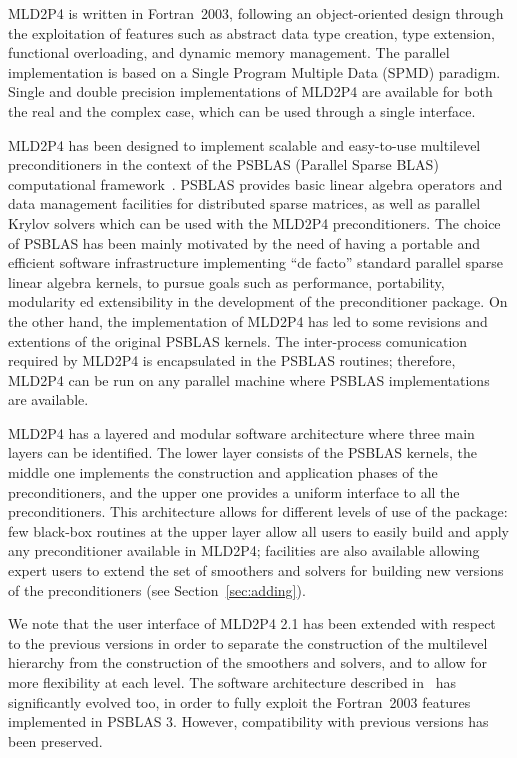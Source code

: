 MLD2P4 is written in Fortran~2003, following an
object-oriented design through the exploitation of features
such as abstract data type creation, type extension, functional overloading, and
dynamic memory management. %
The parallel implementation is based on a Single Program Multiple Data
(SPMD) paradigm.  Single and
double precision implementations of MLD2P4 are available for both the
real and the complex case, which can be used through a single
interface. 

MLD2P4 has been designed to implement scalable and easy-to-use
multilevel preconditioners in the context of the PSBLAS (Parallel Sparse BLAS)
computational framework~\cite{psblas_00,PSBLAS3}. PSBLAS provides basic linear algebra
operators and data management facilities for distributed sparse matrices,
as well as parallel Krylov solvers which can be used with the MLD2P4 preconditioners.
The choice of PSBLAS has been mainly motivated by the need of having
a portable and efficient software infrastructure implementing ``de facto'' standard
parallel sparse linear algebra kernels, to pursue goals such as performance,
portability, modularity ed extensibility in the development of the preconditioner
package. On the other hand, the implementation of MLD2P4 has led to some
revisions and extentions of the original PSBLAS kernels.
The inter-process comunication required by MLD2P4 is encapsulated
in the PSBLAS routines;
therefore, MLD2P4 can be run on any parallel machine where PSBLAS 
implementations are available.

MLD2P4 has a layered and modular software architecture where three main layers can be
identified.  The lower layer consists of the PSBLAS kernels, the middle one implements
the construction and application phases of the preconditioners, and the upper one
provides a uniform interface to all the preconditioners. 
This architecture allows for different levels of use of the package:
few black-box routines at the upper layer allow all users to easily
build and apply any preconditioner available in MLD2P4;
facilities are also available allowing  expert users to extend the set of smoothers
and solvers for building new versions of the preconditioners (see
Section~\ref{sec:adding}). 

We note that the user interface of MLD2P4 2.1 has been extended with respect to the
previous versions in order to separate the construction of the multilevel hierarchy from
the construction of the smoothers and solvers, and to allow for more flexibility
at each level. The software architecture described in~\cite{MLD2P4_TOMS} has significantly
evolved too, in order to fully exploit the Fortran~2003 features implemented in PSBLAS 3.
However, compatibility with previous versions has been preserved.

